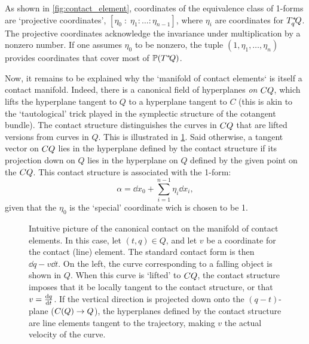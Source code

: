 As shown in \cref{fig:contact_element}, coordinates of the equivalence class of 1-forms are `projective coordinates', $[\eta_0\;:\;\eta_1:\ldots :\eta_{n-1}]$, where $\eta_i$ are coordinates for $T_q^*\!Q$. The projective coordinates acknowledge the invariance under multiplication by a nonzero number. If one assumes $\eta_0$ to be nonzero, the tuple $(1, \eta_1, \ldots, \eta_n)$ provides coordinates that cover most of $\mathbb{P}\qty(T^*\!Q)$. 

Now, it remains to be explained why the `manifold of contact elements` is itself a contact manifold. Indeed, there is a canonical field of hyperplanes \emph{on} $CQ$, which lifts the hyperplane tangent to $Q$ to a hyperplane tangent to $C$ (this is akin to the `tautological' trick played in the symplectic structure of the cotangent bundle). The contact structure distinguishes the curves in $CQ$ that are lifted versions from curves in $Q$. This is illustrated in \cref{fig:contact_lift}. \cite{Burke1985}
Said otherwise, a tangent vector on $CQ$ lies in the hyperplane defined by the contact structure if its projection down on $Q$ lies in the hyperplane on $Q$ defined by the given point on the $CQ$. This contact structure is associated with the 1-form:
$$ \alpha = \dd{x}_0 + \sum_{i = 1}^{n-1} \eta_i\dd{x}_i,$$
given that the $\eta_0$ is the `special' coordinate wich is chosen to be 1.

\begin{figure}[h!]
    \begin{center}
        
    \end{center}
    \caption{Intuitive picture of the canonical contact on the manifold of contact elements. In this case, let $ (t, q) \in Q$, and let $v$ be a coordinate for the contact (line) element. The standard contact form is then $\dd{q} - v\dd{t}$. On the left, the curve corresponding to a falling object is shown in $Q$. When this curve is `lifted' to $CQ$, the contact structure imposes that it be locally tangent to the contact structure, or that $v = \dv{q}{t}$. If the vertical direction is projected down onto the $(q-t)$-plane ($C(Q) \to Q$), the hyperplanes defined by the contact structure are line elements tangent to the trajectory, making $v$ the actual velocity of the curve.}
    \label{fig:contact_lift}
\end{figure}

